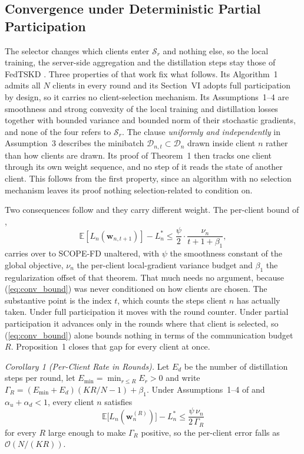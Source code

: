 \documentclass[journal]{IEEEtran}
\newcommand{\rev}[1]{{\color{blue}#1}}
\begin{document}
\subsection{\rev{Convergence under Deterministic Partial Participation}}
\label{ssec:convergence-compat}

\rev{The selector changes which clients enter $\mathcal{S}_r$ and nothing else, so the local training, the server-side aggregation and the distillation steps stay those of FedTSKD \cite{mu2024fedtskd}. Three properties of that work fix what follows. Its Algorithm~1 admits all $N$ clients in every round and its Section~VI adopts full participation by design, so it carries no client-selection mechanism. Its Assumptions~1--4 are smoothness and strong convexity of the local training and distillation losses together with bounded variance and bounded norm of their stochastic gradients, and none of the four refers to $\mathcal{S}_r$. The clause \emph{uniformly and independently} in Assumption~3 describes the minibatch $\mathcal{D}_{n,t} \subset \mathcal{D}_n$ drawn inside client $n$ rather than how clients are drawn. Its proof of Theorem~1 then tracks one client through its own weight sequence, and no step of it reads the state of another client. This follows from the first property, since an algorithm with no selection mechanism leaves its proof nothing selection-related to condition on.}

\rev{Two consequences follow and they carry different weight. The per-client bound of \cite[Theorem~1]{mu2024fedtskd},}
\begin{equation}
\mathbb{E}\!\left[L_n\!\left(\bm{w}_{n,t+1}\right)\right] - L_n^{*} \le \frac{\psi}{2}\cdot\frac{\nu_n}{t+1+\beta_1},
\label{eq:conv_bound}
\end{equation}
\rev{carries over to SCOPE-FD unaltered, with $\psi$ the smoothness constant of the global objective, $\nu_n$ the per-client local-gradient variance budget and $\beta_1$ the regularization offset of that theorem. That much needs no argument, because (\ref{eq:conv_bound}) was never conditioned on how clients are chosen. The substantive point is the index $t$, which counts the steps client $n$ has actually taken. Under full participation it moves with the round counter. Under partial participation it advances only in the rounds where that client is selected, so (\ref{eq:conv_bound}) alone bounds nothing in terms of the communication budget $R$. Proposition~1 closes that gap for every client at once.}

\rev{\textit{Corollary 1 (Per-Client Rate in Rounds).} Let $E_d$ be the number of distillation steps per round, let $E_{\min} = \min_{r \le R} E_r > 0$ and write $\Gamma_R = (E_{\min}+E_d)\left(KR/N - 1\right) + \beta_1$. Under Assumptions~1--4 of \cite{mu2024fedtskd} and $\alpha_u + \alpha_d < 1$, every client $n$ satisfies}
\begin{equation}
\mathbb{E}\bigl[L_n(\bm{w}_n^{(R)})\bigr] - L_n^{*} \le \frac{\psi\, \nu_n}{2\,\Gamma_R}
\label{eq:cor_perclient}
\end{equation}
\rev{for every $R$ large enough to make $\Gamma_R$ positive, so the per-client error falls as $\mathcal{O}(N/(KR))$.}
\end{document}
